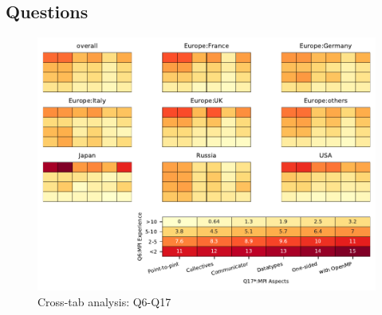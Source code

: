 
\subsection{Questions}


\begin{figure}
\begin{center}
\includegraphics[width=12cm]{../pdfs/Q6-Q17.pdf}
\caption{Cross-tab analysis: Q6-Q17}
\label{fig:Q6-Q17}
\end{center}
\end{figure}
